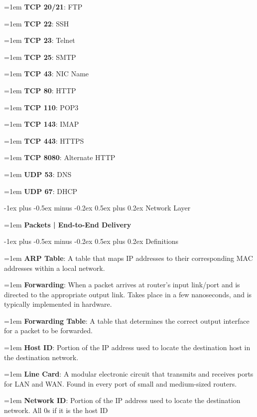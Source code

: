 \documentclass[letterpaper,8pt]{extarticle}
\makeatletter
\newcommand{\definition}[2]{
  \hangindent=1em
  \textbf{#1}: #2%
}
\newcommand{\subtitle}[2]{
  \hangindent=1em
  \textbf{\color{h4}#1 | #2}\\
  \hrulefill
}
\renewcommand{\section}{\@startsection{section}{1}{0mm}%
  {-1ex plus -0.5ex minus -0.2ex}%
  {0.5ex plus 0.2ex}%
{\color{h1} \normalfont\small\bfseries}}
\renewcommand{\subsection}{\@startsection{subsection}{2}{0mm}%
  {-1ex plus -0.5ex minus -0.2ex}%
  {0.5ex plus 0.2ex}%
{\color{h2}\normalfont\fontsize{6}{6}\selectfont\bfseries}}
\makeatother
\begin{document}
\begin{multicols*}{5}
\begin{multicols*}{3}
    \definition{TCP 20/21}{FTP}

    \definition{TCP 22}{SSH}

    \definition{TCP 23}{Telnet}

    \definition{TCP 25}{SMTP}

    \definition{TCP 43}{NIC Name}

    \definition{TCP 80}{HTTP}

    \definition{TCP 110}{POP3}

    \definition{TCP 143}{IMAP}

    \definition{TCP 443}{HTTPS}

    \definition{TCP 8080}{Alternate HTTP}

    \definition{UDP 53}{DNS}

    \definition{UDP 67}{DHCP}

  \end{multicols*}



  \section{Network Layer}

  \subtitle{Packets}{End-to-End Delivery}

  \subsection{Definitions}

  \definition{ARP Table}{A table that maps IP addresses to their corresponding MAC addresses within a local network.}

  \definition{Forwarding}{When a packet arrives at router's input link/port and is directed to the appropriate output link. Takes place in a few nanoseconds, and is typically implemented in hardware.}

  \definition{Forwarding Table}{A table that determines the correct output interface for a packet to be forwarded.}

  \definition{Host ID}{Portion of the IP address used to locate the destination host in the destination network.}

  \definition{Line Card}{A modular electronic circuit that transmits and receives ports for LAN and WAN. Found in every port of small and medium-sized routers.}

  \definition{Network ID}{Portion of the IP address used to locate the destination network. All 0s if it is the host ID}


\end{multicols*}
\end{document}

